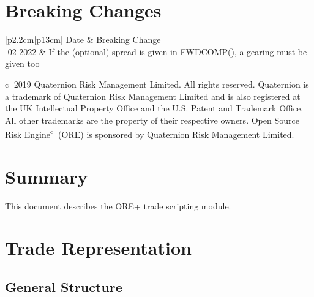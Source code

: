 \documentclass[12pt, a4paper]{article}
\begin{document}
\vspace{3cm}

\newpage

\section*{Breaking Changes}

\begin{center}
\begin{supertabular}{|p{2.2cm}|p{13cm}|}
  \hline
  Date & Breaking Change \\
  -02-2022 & If the (optional) spread is given in FWDCOMP(), a gearing must be given too
 \\ \hline
\end{supertabular}
\end{center}

\vspace{3cm}

\newpage

\tableofcontents

\newpage

\vspace*{\fill}

\textcircled{c} 2019 Quaternion Risk Management Limited.  All rights reserved.
Quaternion\textsuperscript{\textregistered} is a trademark of Quaternion Risk Management Limited and is also registered
at the UK Intellectual Property Office and the U.S. Patent and Trademark Office.  All other trademarks are the property
of their respective owners. Open Source Risk Engine\textsuperscript{\textcircled{c}} (ORE) is sponsored by Quaternion
Risk Management Limited.

\newpage

\section{Summary}

This document describes the ORE+ trade scripting module.

\section{Trade Representation}

\subsection{General Structure}\label{generalStructure}

\end{document}

